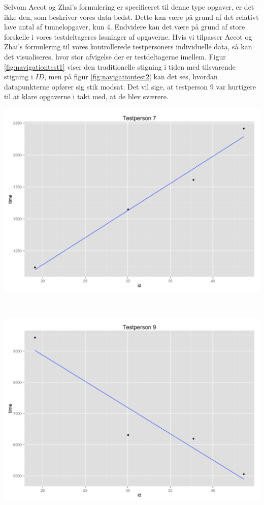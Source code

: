 Selvom Accot og Zhai's formulering er specificeret til denne type opgaver, er det ikke den, som beskriver vores data bedst. Dette kan være på grund af det relativt lave antal af tunnelopgaver, kun 4. Endvidere kan det være på grund af store forskelle i vores testdeltageres løsninger af opgaverne. Hvis vi tilpasser Accot og Zhai's formulering til vores kontrollerede testpersoners individuelle data, så kan det visualiseres, hvor stor afvigelse der er testdeltagerne imellem. Figur \ref{fig:navigationtest1} viser den traditionelle stigning i tiden med tilsvarende stigning i $ID$, men på figur \ref{fig:navigationtest2} kan det ses, hvordan datapunkterne opfører sig stik modsat. Det vil sige, at testperson 9 var hurtigere til at klare opgaverne i takt med, at de blev sværere.

\begin{minipage}{\linewidth}
	\begin{minipage}[b]{.45\linewidth}
		\includegraphics[width=\textwidth]{images/plots/plot_model_test_navigation_1}
		\label{fig:navigationtest1}
	\end{minipage}
	\begin{minipage}[b]{0.1\linewidth}
	~
	\end{minipage}
	\begin{minipage}[b]{0.45\linewidth}
		\includegraphics[width=\textwidth]{images/plots/plot_model_test_navigation_2}

\end{minipage}
\end{minipage}
